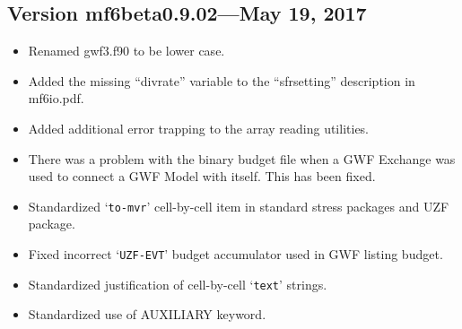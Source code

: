 	\subsection{Version mf6beta0.9.02---May 19, 2017}
	\begin{itemize}
		\item Renamed gwf3.f90 to be lower case.
		\item Added the missing ``divrate'' variable to the ``sfrsetting'' description in mf6io.pdf.
		\item Added additional error trapping to the array reading utilities.
		\item There was a problem with the binary budget file when a GWF Exchange was used to connect a GWF Model with itself.  This has been fixed.
		\item Standardized `\texttt{to-mvr}' cell-by-cell item in standard stress packages and UZF package.
		\item Fixed incorrect `\texttt{UZF-EVT}' budget accumulator used in GWF listing budget. 
		\item Standardized justification of cell-by-cell `\texttt{text}' strings.
		\item Standardized use of AUXILIARY keyword.
	\end{itemize}
